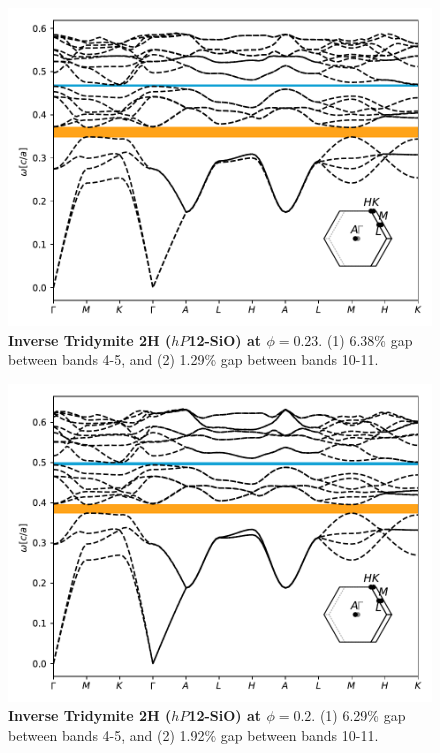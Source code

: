 \documentclass[fleqn,amsmath,amssymb,superscriptaddress, reprint,prl]{revtex4-1}
\begin{document}
\begin{figure}
\includegraphics[width=0.9\linewidth]{workspace/457a491115d70a5bb55bbe9b40ae68be/images/r=37.pdf}
	\caption{\textbf{Inverse Tridymite 2H ($hP$12-SiO) at $\phi=0.23$}. (1) 6.38\% gap between bands 4-5, and (2) 1.29\% gap between bands 10-11.}
\end{figure}

\begin{figure}
\includegraphics[width=0.9\linewidth]{workspace/457a491115d70a5bb55bbe9b40ae68be/images/r=38.pdf}
	\caption{\textbf{Inverse Tridymite 2H ($hP$12-SiO) at $\phi=0.2$}. (1) 6.29\% gap between bands 4-5, and (2) 1.92\% gap between bands 10-11.}
\end{figure}
\end{document}
